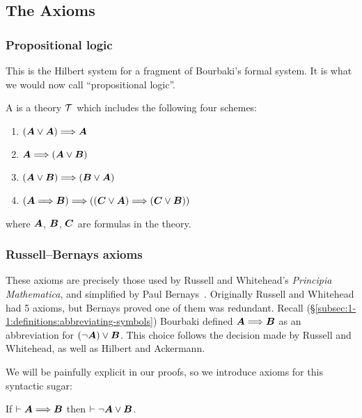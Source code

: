 \subsection{The Axioms}
\setcounter{subsubsection}{-1}
\subsubsection{Propositional logic} This is the Hilbert system for
a fragment of Bourbaki's formal system. It is what we would now call
``propositional logic''.

\begin{definition}
A  is a theory $\mathcal{T}$ which includes the
following four schemes:
\begin{enumerate}[label=(S\arabic*),ref={S\arabic*}]
\item\label{axiom:s1} $(\boldsymbol{A}\lor\boldsymbol{A})\Longrightarrow\boldsymbol{A}$
\item\label{axiom:s2} $\boldsymbol{A}\Longrightarrow(\boldsymbol{A}\lor\boldsymbol{B})$
\item\label{axiom:s3} $(\boldsymbol{A}\lor\boldsymbol{B})\Longrightarrow(\boldsymbol{B}\lor\boldsymbol{A})$
\item\label{axiom:s4} $(\boldsymbol{A}\Longrightarrow\boldsymbol{B})\Longrightarrow((\boldsymbol{C}\lor\boldsymbol{A})\Longrightarrow(\boldsymbol{C}\lor\boldsymbol{B}))$
\end{enumerate}
where $\boldsymbol{A}$, $\boldsymbol{B}$, $\boldsymbol{C}$
are formulas in the theory.
\end{definition}

\subsubsection{Russell--Bernays axioms}
These axioms are precisely those used by Russell and Whitehead's
\textit{Principia Mathematica}, and simplified by Paul
Bernays~\cite{bernays1926}. Originally Russell and Whitehead had 5
axioms, but Bernays proved one of them was redundant.
Recall (\S\ref{subsec:1-1:definitions:abbreviating-symbols})
Bourbaki defined $\boldsymbol{A}\Longrightarrow\boldsymbol{B}$ as an
abbreviation for $(\neg\boldsymbol{A})\lor\boldsymbol{B}$. This
choice follows the decision made by Russell and Whitehead, as well as
Hilbert and Ackermann.

We will be painfully explicit in our proofs, so we introduce axioms for
this syntactic sugar:
\begin{syn}\label{unfold-implies}
If $\vdash\boldsymbol{A}\Longrightarrow\boldsymbol{B}$
then $\vdash\neg\boldsymbol{A}\lor\boldsymbol{B}$.
\end{syn}

